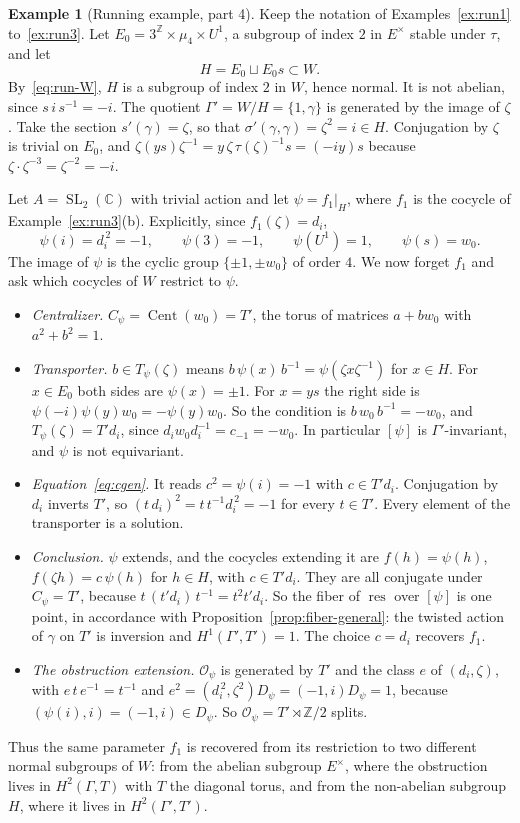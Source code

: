 \documentclass[12pt,letterpaper]{article}
\numberwithin{equation}{section}
\theoremstyle{plain}
\theoremstyle{definition}
\newtheorem{example}[theorem]{Example}
\newcommand{\Z}{\mathbb{Z}}
\newcommand{\C}{\mathbb{C}}
\DeclareMathOperator{\Cent}{Cent}
\DeclareMathOperator{\SL}{SL}
\DeclareMathOperator{\res}{res}
\begin{document}
\begin{example}[Running example, part 4]\label{ex:runH}
Keep the notation of Examples~\ref{ex:run1} to~\ref{ex:run3}. Let
$E_0=3^{\Z}\times\mu_4\times U^1$, a subgroup of index $2$ in $E^\times$
stable under $\tau$, and let
\[
H=E_0\sqcup E_0s\subset W .
\]
By~\eqref{eq:run-W}, $H$ is a subgroup of index $2$ in $W$, hence normal.
It is not abelian, since $s\,i\,s^{-1}=-i$. The quotient
$\Gamma'=W/H=\{1,\gamma\}$ is generated by the image of $\zeta$. Take the
section $s'(\gamma)=\zeta$, so that $\sigma'(\gamma,\gamma)=\zeta^2=i\in H$.
Conjugation by $\zeta$ is trivial on $E_0$, and
$\zeta(ys)\zeta^{-1}=y\,\zeta\,\tau(\zeta)^{-1}s=(-iy)s$ because
$\zeta\cdot\zeta^{-3}=\zeta^{-2}=-i$.

Let $A=\SL_2(\C)$ with trivial action and let $\psi=f_1|_H$, where $f_1$
is the cocycle of Example~\ref{ex:run3}(b). Explicitly, since
$f_1(\zeta)=d_i$,
\[
\psi(i)=d_i^{\,2}=-1,\qquad\psi(3)=-1,\qquad\psi(U^1)=1,\qquad\psi(s)=w_0 .
\]
The image of $\psi$ is the cyclic group $\{\pm1,\pm w_0\}$ of order $4$.
We now forget $f_1$ and ask which cocycles of $W$ restrict to $\psi$.
\begin{itemize}[itemsep=1pt]
\item \emph{Centralizer.} $C_\psi=\Cent(w_0)=T'$, the torus of matrices
$a+bw_0$ with $a^2+b^2=1$.
\item \emph{Transporter.} $b\in T_\psi(\zeta)$ means
$b\,\psi(x)\,b^{-1}=\psi(\zeta x\zeta^{-1})$ for $x\in H$. For $x\in E_0$
both sides are $\psi(x)=\pm1$. For $x=ys$ the right side is
$\psi(-i)\psi(y)w_0=-\psi(y)w_0$. So the condition is
$b\,w_0\,b^{-1}=-w_0$, and $T_\psi(\zeta)=T'd_i$, since
$d_iw_0d_i^{-1}=c_{-1}=-w_0$. In particular $[\psi]$ is
$\Gamma'$-invariant, and $\psi$ is not equivariant.
\item \emph{Equation~\eqref{eq:cgen}.} It reads $c^2=\psi(i)=-1$ with
$c\in T'd_i$. Conjugation by $d_i$ inverts $T'$, so
$(t\,d_i)^2=t\,t^{-1}d_i^{\,2}=-1$ for every $t\in T'$. Every element of
the transporter is a solution.
\item \emph{Conclusion.} $\psi$ extends, and the cocycles extending it
are $f(h)=\psi(h)$, $f(\zeta h)=c\,\psi(h)$ for $h\in H$, with
$c\in T'd_i$. They are all conjugate under $C_\psi=T'$, because
$t\,(t'd_i)\,t^{-1}=t^2t'd_i$. So the fiber of $\res$ over $[\psi]$ is one
point, in accordance with Proposition~\ref{prop:fiber-general}: the
twisted action of $\gamma$ on $T'$ is inversion and $H^1(\Gamma',T')=1$.
The choice $c=d_i$ recovers $f_1$.
\item \emph{The obstruction extension.} $\mathcal{O}_\psi$ is generated by
$T'$ and the class $e$ of $(d_i,\zeta)$, with $e\,t\,e^{-1}=t^{-1}$ and
$e^2=(d_i^{\,2},\zeta^2)D_\psi=(-1,i)D_\psi=1$, because
$(\psi(i),i)=(-1,i)\in D_\psi$. So $\mathcal{O}_\psi=T'\rtimes\Z/2$ splits.
\end{itemize}
Thus the same parameter $f_1$ is recovered from its restriction to two
different normal subgroups of $W$: from the abelian subgroup $E^\times$,
where the obstruction lives in $H^2(\Gamma,T)$ with $T$ the diagonal
torus, and from the non-abelian subgroup $H$, where it lives in
$H^2(\Gamma',T')$.
\end{example}
\end{document}
